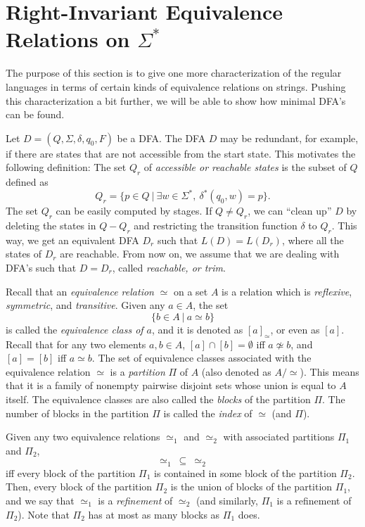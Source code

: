 \section{Right-Invariant Equivalence Relations on $\Sigma^*$}
\label{secmn1}
The purpose of this section is to give one more
characterization of the regular languages in terms
of certain kinds of equivalence relations on strings.
Pushing this characterization a bit further, we will
be able to show how  minimal DFA's can be found.

\medskip
Let $D = (Q, \Sigma, \delta, q_0, F)$ be a DFA.
The DFA $D$ may be redundant, for example, if there
are states that are not accessible from the start state.
This motivates the following definition:
The set $Q_{r}$ of {\it accessible or reachable states\/} is the subset of $Q$
defined as
$$Q_{r} = \{p \in Q\ |\ \exists w\in\Sigma^*,\ \delta^*(q_0,w) = p\}.$$
The set $Q_{r}$ can be easily computed by stages.
If $Q\not= Q_{r}$, we can ``clean up'' $D$ by deleting the states
in $Q - Q_{r}$ and restricting the transition function $\delta$
to $Q_{r}$. This way, we get an equivalent DFA $D_r$
such that $L(D) = L(D_r)$, where all the states of $D_r$ are
reachable. From now on, we assume that we are dealing with
DFA's such that $D = D_{r}$, called {\it reachable, or trim\/}.

\medskip
Recall that an {\it equivalence relation\/} $\simeq$ on a set $A$ is
a relation which is {\it reflexive\/}, {\it symmetric\/},
and {\it transitive\/}. Given any $a\in A$, the set
$$\{b\in A\ |\ a\simeq b\}$$
is called the {\it equivalence class of $a$\/}, and it is denoted
as $[a]_{\simeq}$, or even as $[a]$.
Recall that for any two elements $a, b\in A$,
$[a]\cap [b] = \emptyset$ iff $a\not\simeq b$, and
$[a] = [b]$ iff $a\simeq b$. The set of equivalence classes associated
with the equivalence relation $\simeq$ is a {\it partition\/} $\Pi$
of $A$ (also denoted as $A/\simeq$).
This means that it is a family of nonempty pairwise
disjoint sets whose union is equal to $A$ itself.
The equivalence classes are also called the {\it blocks\/}
of the partition $\Pi$.
The number of blocks in the partition $\Pi$
is called the {\it index\/} of $\simeq$ (and $\Pi$).

\medskip
Given any two equivalence relations $\simeq_1$ and $\simeq_2$
with associated partitions $\Pi_1$ and $\Pi_2$, 
$$\simeq_1\> \subseteq\> \simeq_2$$
iff
every block of the partition $\Pi_1$ is contained in some
block of the partition $\Pi_2$.
Then, every block of the partition $\Pi_2$ is the union of
blocks of the partition $\Pi_1$, and we say that
$\simeq_1$ is a {\it refinement\/} of $\simeq_2$
(and similarly, $\Pi_1$ is a refinement of $\Pi_2$).
Note that $\Pi_2$ has at most as many blocks as $\Pi_1$ does.

